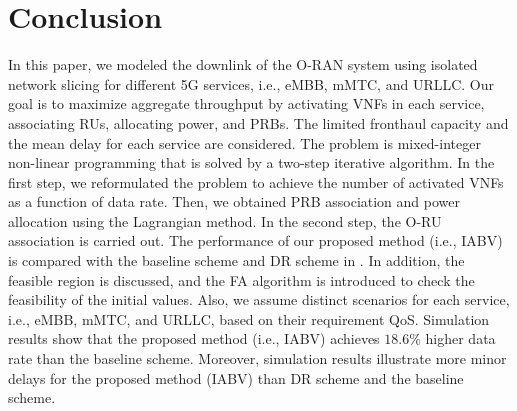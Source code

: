 \documentclass[lettersize,journal]{IEEEtran}
\begin{document}
\section{Conclusion}\label{conc}
In this paper, we modeled the downlink of the O-RAN system using isolated network slicing for different 5G services, i.e., eMBB, mMTC, and URLLC.
Our goal is to maximize aggregate throughput by activating VNFs in each service, associating RUs, allocating power, and PRBs. The limited fronthaul capacity and the mean delay for each service are considered.
The problem is mixed-integer non-linear programming that is solved by a two-step iterative algorithm.
In the first step, we reformulated the problem to achieve the number of activated VNFs as a function of data rate. Then, we obtained PRB association and power allocation using the Lagrangian method.
In the second step, the O-RU association is carried out.
The performance of our proposed method (i.e., IABV) is compared with the baseline scheme and DR scheme in \cite{lee2018dynamic}.
In addition, the feasible region is discussed, and the FA algorithm is introduced to check the feasibility of the initial values.
Also, we assume distinct scenarios for each service, i.e., eMBB, mMTC, and URLLC, based on their requirement QoS.
Simulation results show that the proposed method (i.e., IABV) achieves $18.6\%$ higher data rate than the baseline scheme.
Moreover, simulation results illustrate more minor delays for the proposed method (IABV) than DR scheme and the baseline scheme.
\vspace*{-1.1em}


%
\end{document}
